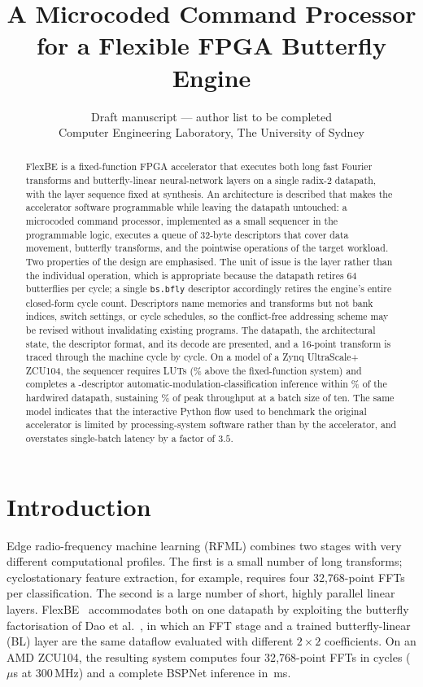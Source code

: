 \documentclass[twocolumn,10pt]{article}
\title{\LARGE\bfseries A Microcoded Command Processor for a Flexible
FPGA Butterfly Engine}
\author{%
Draft manuscript --- author list to be completed\\
\normalsize Computer Engineering Laboratory, The University of Sydney}
\date{}
\newcommand{\op}[1]{\texttt{#1}}
\begin{document}
\maketitle

\begin{abstract}
\noindent
FlexBE is a fixed-function FPGA accelerator that executes both long fast
Fourier transforms and butterfly-linear neural-network layers on a single
radix-2 datapath, with the layer sequence fixed at synthesis.  An architecture
is described that makes the accelerator software programmable while leaving the
datapath untouched: a microcoded command processor, implemented as a small
sequencer in the programmable logic, executes a queue of 32-byte descriptors
that cover data movement, butterfly transforms, and the pointwise operations of
the target workload.  Two properties of the design are emphasised.  The unit of
issue is the layer rather than the individual operation, which is appropriate
because the datapath retires 64 butterflies per cycle; a single \op{bs.bfly}
descriptor accordingly retires the engine's entire closed-form cycle count.
Descriptors name memories and transforms but not bank indices, switch settings,
or cycle schedules, so the conflict-free addressing scheme may be revised
without invalidating existing programs.  The datapath, the architectural state,
the descriptor format, and its decode are presented, and a 16-point transform
is traced through the machine cycle by cycle.  On a model of a Zynq
UltraScale+ ZCU104, the sequencer requires \SeqLut{} LUTs
(\SeqPct\% above the fixed-function system) and completes a
\ProgCmds-descriptor automatic-modulation-classification inference within
\TunedOvh\% of the hardwired datapath, sustaining \TunedBatchTenPct\% of peak
throughput at a batch size of ten.  The same model indicates that the
interactive Python flow used to benchmark the original accelerator is limited by
processing-system software rather than by the accelerator, and overstates
single-batch latency by a factor of $3.5$.
\end{abstract}

\section{Introduction}\label{sec:intro}

Edge radio-frequency machine learning (RFML) combines two stages with very
different computational profiles.  The first is a small number of long
transforms; cyclostationary feature extraction, for example, requires four
32{,}768-point FFTs per classification.  The second is a large number of short,
highly parallel linear layers.  FlexBE~\cite{flexbe} accommodates both on one
datapath by exploiting the butterfly factorisation of Dao et
al.~\cite{dao2019butterfly}, in which an FFT stage and a trained
butterfly-linear (BL) layer are the same dataflow evaluated with different
$2{\times}2$ coefficients.  On an AMD ZCU104, the resulting system computes four
32{,}768-point FFTs in \HeadlineCycles{} cycles (\HeadlineUs\,$\mu$s at
300\,MHz) and a complete BSPNet inference in \CfgMs\,ms.
\end{document}
